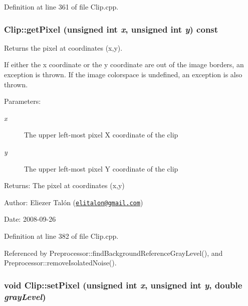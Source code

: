 Definition at line 361 of file Clip.cpp.\hypertarget{class_clip_74eded11c0dcbd2b10b453074cbb8b84}{
\subsubsection[getPixel]{ Clip::getPixel (unsigned int {\em x}, \/  unsigned int {\em y}) const}}
\label{class_clip_74eded11c0dcbd2b10b453074cbb8b84}


Returns the pixel at coordinates (x,y). 

If either the x coordinate or the y coordinate are out of the image borders, an exception is thrown. If the image colorspace is undefined, an exception is also thrown.

\begin{Desc}
\item[Parameters:]
\begin{description}
\item[{\em x}]The upper left-most pixel X coordinate of the clip \item[{\em y}]The upper left-most pixel Y coordinate of the clip\end{description}
\end{Desc}
\begin{Desc}
\item[Returns:]The pixel at coordinates (x,y)\end{Desc}
\begin{Desc}
\item[Author:]Eliezer Talón (\href{mailto:elitalon@gmail.com}{\tt elitalon@gmail.com}) \end{Desc}
\begin{Desc}
\item[Date:]2008-09-26 \end{Desc}


Definition at line 382 of file Clip.cpp.

Referenced by Preprocessor::findBackgroundReferenceGrayLevel(), and Preprocessor::removeIsolatedNoise().\hypertarget{class_clip_3c48493242de7453438ed0e8d0ea74df}{
\subsubsection[setPixel]{\setlength{\rightskip}{0pt plus 5cm}void Clip::setPixel (unsigned int {\em x}, \/  unsigned int {\em y}, \/  double {\em grayLevel})}}
\label{class_clip_3c48493242de7453438ed0e8d0ea74df}


